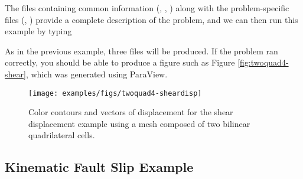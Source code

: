 The files containing common information (,
, ) along with
the problem-specific files (,
) provide a complete description of the
problem, and we can then run this example by typing
As in the previous example, three files will be produced. If the
problem ran correctly, you should be able to produce a figure such as
Figure \vref{fig:twoquad4-shear}, which was generated using ParaView.

\begin{figure}
  \texttt{[image: examples/figs/twoquad4-sheardisp]}
  \caption{Color contours and vectors of displacement for the shear
    displacement example using a mesh composed of two bilinear
    quadrilateral cells.}
  \label{fig:twoquad4-shear}
\end{figure}


\subsection{Kinematic Fault Slip Example}

